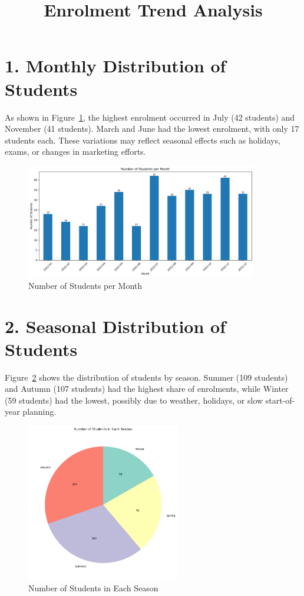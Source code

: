 \documentclass[12pt,a4paper]{article}
\title{Enrolment Trend Analysis}
\date{}
\begin{document}
\maketitle

\section*{1. Monthly Distribution of Students}

As shown in Figure~\ref{fig:monthly-students}, the highest enrolment occurred in July (42 students) and November (41 students). March and June had the lowest enrolment, with only 17 students each. These variations may reflect seasonal effects such as holidays, exams, or changes in marketing efforts.

\begin{figure}[h!]
    \centering
    \includegraphics[width=0.9\textwidth]{Number of Students per Month.png}
    \caption{Number of Students per Month}
    \label{fig:monthly-students}
\end{figure}

\section*{2. Seasonal Distribution of Students}

Figure~\ref{fig:seasonal-students} shows the distribution of students by season. Summer (109 students) and Autumn (107 students) had the highest share of enrolments, while Winter (59 students) had the lowest, possibly due to weather, holidays, or slow start-of-year planning.

\begin{figure}[h!]
    \centering
    \includegraphics[width=0.6\textwidth]{Number of Students in Each Season (Pie Chart).png}
    \caption{Number of Students in Each Season}
    \label{fig:seasonal-students}
\end{figure}
\end{document}
